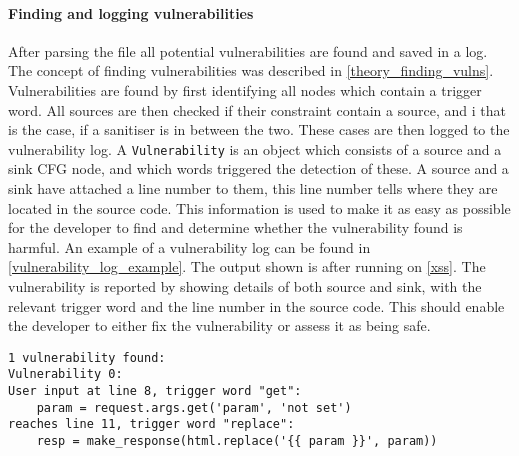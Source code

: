 \paragraph{Finding and logging vulnerabilities}
After parsing the file all potential vulnerabilities are found and saved in a log.
The concept of finding vulnerabilities was described in \cref{theory_finding_vulns}.
Vulnerabilities are found by first identifying all nodes which contain a trigger word.
All sources are then checked if their constraint contain a source, and i that is the case, if a sanitiser is in between the two.
These cases are then logged to the vulnerability log.
A \texttt{Vulnerability} is an object which consists of a source and a sink CFG node, and which words triggered the detection of these.
A source and a sink have attached a line number to them, this line number tells where they are located in the source code.
This information is used to make it as easy as possible for the developer to find and determine whether the vulnerability found is harmful.
An example of a vulnerability log can be found in \cref{vulnerability_log_example}.
The output shown is after running \pyt{} on \cref{xss}.
The vulnerability is reported by showing details of both source and sink, with the relevant trigger word and the line number in the source code.
This should enable the developer to either fix the vulnerability or assess it as being safe.

\begin{lstlisting}[style=default, caption={An example of how the vulnerability log looks after it found one vulnerability.}, label={vulnerability_log_example}]
1 vulnerability found:
Vulnerability 0:
User input at line 8, trigger word "get": 
    param = request.args.get('param', 'not set')
reaches line 11, trigger word "replace": 
    resp = make_response(html.replace('{{ param }}', param))
\end{lstlisting}
